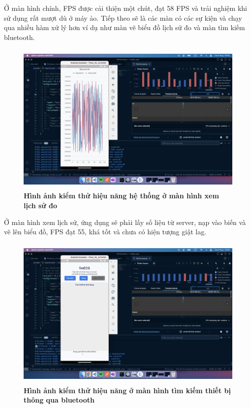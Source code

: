 \begin{enumerate}[a)]
    Ở màn hình chính, FPS được cải thiện một chút, đạt 58 FPS và trải nghiệm khi sử dụng rất mượt dù ở máy ảo. Tiếp theo
    sẽ là các màn có các sự kiện và chạy qua nhiều hàm xử lý hơn ví dụ như màn vẽ biểu đồ lịch sử đo và màn tìm kiếm bluetooth.
    
    \begin{figure}[H]
      \centering
      \includegraphics[width=12cm,height=7.5cm]{Images/mobile_app/demo/history_chart_performance.png}
      \caption[Hình ảnh kiểm thử hiệu năng hệ thống ở màn hình xem lịch sử đo]{\bfseries \fontsize{12pt}{0pt}
      \selectfont Hình ảnh kiểm thử hiệu năng hệ thống ở màn hình xem lịch sử đo}
      \label{history_chart_performance}
    \end{figure}

    Ở màn hình xem lịch sử, ứng dụng sẽ phải lấy số liệu từ server, nạp vào biến và vẽ lên biểu đồ, FPS đạt 55, khá tốt và chưa
    có hiện tượng giật lag.

    \begin{figure}[H]
      \centering
      \includegraphics[width=12cm,height=7.5cm]{Images/mobile_app/demo/find_device_performance.png}
      \caption[Hình ảnh kiểm thử hiệu năng ở màn hình tìm kiếm thiết bị thông qua bluetooth]{\bfseries \fontsize{12pt}{0pt}
      \selectfont Hình ảnh kiểm thử hiệu năng ở màn hình tìm kiếm thiết bị thông qua bluetooth}
      \label{find_device_performance}
    \end{figure}


\end{enumerate}
